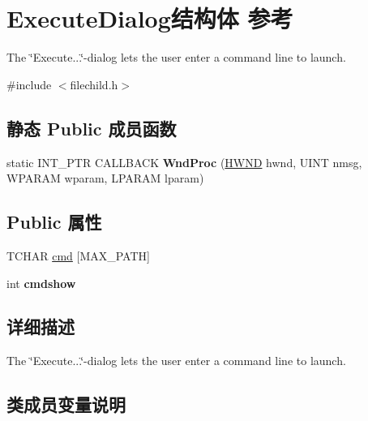 \hypertarget{struct_execute_dialog}{}\section{Execute\+Dialog结构体 参考}
\label{struct_execute_dialog}


The \char`\"{}\+Execute...\char`\"{}-\/dialog lets the user enter a command line to launch.  




{\ttfamily \#include $<$filechild.\+h$>$}

\subsection*{静态 Public 成员函数}
\begin{DoxyCompactItemize}
\item 
\mbox{\label{struct_execute_dialog_a08ec792d946d15407984d7fc8ea61912}} 
static I\+N\+T\+\_\+\+P\+TR C\+A\+L\+L\+B\+A\+CK {\bfseries Wnd\+Proc} (\hyperlink{interfacevoid}{H\+W\+ND} hwnd, U\+I\+NT nmsg, W\+P\+A\+R\+AM wparam, L\+P\+A\+R\+AM lparam)
\end{DoxyCompactItemize}
\subsection*{Public 属性}
\begin{DoxyCompactItemize}
\item 
T\+C\+H\+AR \hyperlink{struct_execute_dialog_a1fb499c2dc131d2a497f734d736ec230}{cmd} \mbox{[}M\+A\+X\+\_\+\+P\+A\+TH\mbox{]}
\item 
\mbox{\label{struct_execute_dialog_a54d260f94fbdc5faf54cc79be52e87ba}} 
int {\bfseries cmdshow}
\end{DoxyCompactItemize}


\subsection{详细描述}
The \char`\"{}\+Execute...\char`\"{}-\/dialog lets the user enter a command line to launch. 

\subsection{类成员变量说明}
\mbox{\label{struct_execute_dialog_a1fb499c2dc131d2a497f734d736ec230}} 
